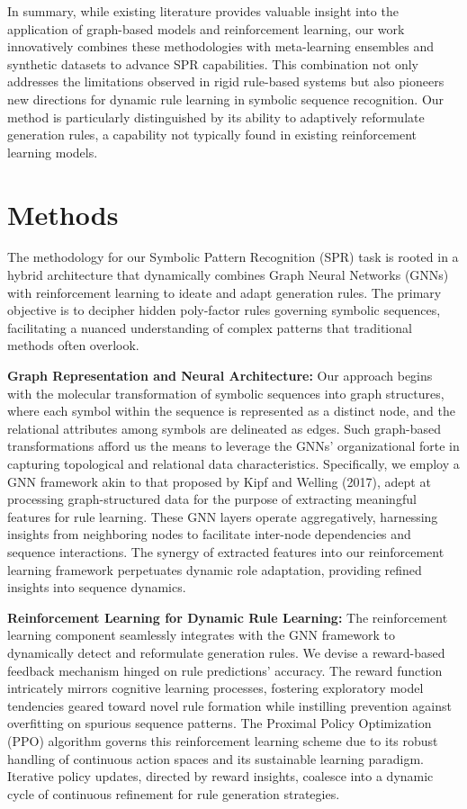 \documentclass{article}
\begin{document}
In summary, while existing literature provides valuable insight into the application of graph-based models and reinforcement learning, our work innovatively combines these methodologies with meta-learning ensembles and synthetic datasets to advance SPR capabilities. This combination not only addresses the limitations observed in rigid rule-based systems but also pioneers new directions for dynamic rule learning in symbolic sequence recognition. Our method is particularly distinguished by its ability to adaptively reformulate generation rules, a capability not typically found in existing reinforcement learning models.

\section{Methods}
The methodology for our Symbolic Pattern Recognition (SPR) task is rooted in a hybrid architecture that dynamically combines Graph Neural Networks (GNNs) with reinforcement learning to ideate and adapt generation rules. The primary objective is to decipher hidden poly-factor rules governing symbolic sequences, facilitating a nuanced understanding of complex patterns that traditional methods often overlook.

\textbf{Graph Representation and Neural Architecture:} Our approach begins with the molecular transformation of symbolic sequences into graph structures, where each symbol within the sequence is represented as a distinct node, and the relational attributes among symbols are delineated as edges. Such graph-based transformations afford us the means to leverage the GNNs' organizational forte in capturing topological and relational data characteristics. Specifically, we employ a GNN framework akin to that proposed by Kipf and Welling (2017), adept at processing graph-structured data for the purpose of extracting meaningful features for rule learning. These GNN layers operate aggregatively, harnessing insights from neighboring nodes to facilitate inter-node dependencies and sequence interactions. The synergy of extracted features into our reinforcement learning framework perpetuates dynamic role adaptation, providing refined insights into sequence dynamics.

\textbf{Reinforcement Learning for Dynamic Rule Learning:} The reinforcement learning component seamlessly integrates with the GNN framework to dynamically detect and reformulate generation rules. We devise a reward-based feedback mechanism hinged on rule predictions' accuracy. The reward function intricately mirrors cognitive learning processes, fostering exploratory model tendencies geared toward novel rule formation while instilling prevention against overfitting on spurious sequence patterns. The Proximal Policy Optimization (PPO) algorithm governs this reinforcement learning scheme due to its robust handling of continuous action spaces and its sustainable learning paradigm. Iterative policy updates, directed by reward insights, coalesce into a dynamic cycle of continuous refinement for rule generation strategies.
\end{document}
